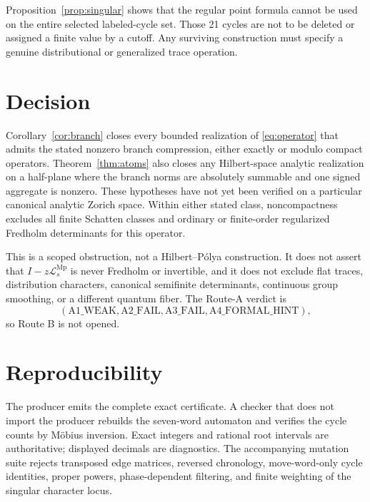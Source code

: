 \documentclass[11pt]{article}
\theoremstyle{remark}
\newcommand{\Mp}{\operatorname{Mp}}
\newcommand{\cL}{\mathcal L}
\begin{document}
Proposition~\ref{prop:singular} shows that the regular point formula cannot be
used on the entire selected labeled-cycle set.  Those 21 cycles are not to be
deleted or assigned a finite value by a cutoff.  Any surviving construction
must specify a genuine distributional or generalized trace operation.

\section{Decision}

Corollary~\ref{cor:branch} closes every bounded realization of
\eqref{eq:operator} that admits the stated nonzero branch compression, either
exactly or modulo compact operators.  Theorem~\ref{thm:atoms} also closes any
Hilbert-space analytic realization on
a half-plane where the branch norms are absolutely summable and one signed
aggregate is nonzero.  These hypotheses have not yet been verified on a
particular canonical analytic Zorich space.  Within either stated class,
noncompactness excludes all finite Schatten classes and ordinary or
finite-order regularized Fredholm determinants for this operator.

This is a scoped obstruction, not a Hilbert--P\'olya construction.  It does
not assert that $I-z\cL_s^{\Mp}$ is never Fredholm or invertible, and it does
not exclude flat traces, distribution characters, canonical semifinite
determinants, continuous group smoothing, or a different quantum fiber.
The Route-A verdict is
\[
 (\mathrm{A1\_WEAK},\mathrm{A2\_FAIL},\mathrm{A3\_FAIL},
  \mathrm{A4\_FORMAL\_HINT}),
\]
so Route B is not opened.

\section*{Reproducibility}

The producer emits the complete exact certificate.  A checker that does not
import the producer rebuilds the seven-word automaton and verifies the cycle
counts by M\"obius inversion.  Exact integers and rational root intervals are
authoritative; displayed decimals are diagnostics.  The accompanying
mutation suite rejects transposed edge matrices, reversed chronology,
move-word-only cycle identities, proper powers, phase-dependent filtering,
and finite weighting of the singular character locus.



\end{document}
